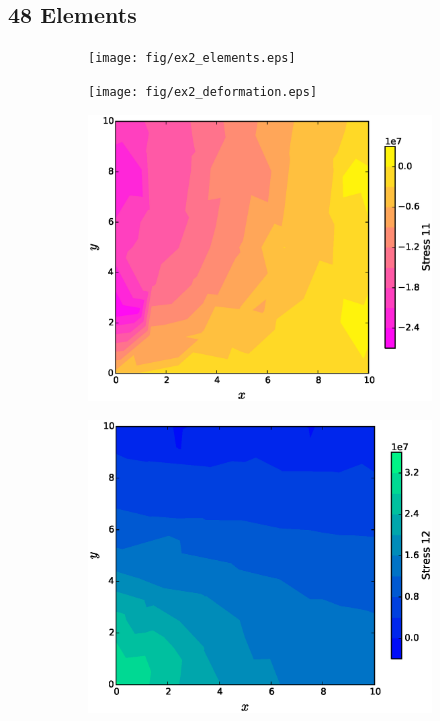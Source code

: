 \documentclass[11pt, a4paper]{article}
\numberwithin{equation}{section}
\begin{document}
\subsection{48 Elements}

\begin{figure}[H]
\centering
	\begin{subfigure}[H]{0.49\textwidth}
		\texttt{[image: fig/ex2\_elements.eps]}
		\caption{}
		\label{fig:1}
	\end{subfigure}
	\begin{subfigure}[H]{0.49\textwidth}
		\texttt{[image: fig/ex2\_deformation.eps]}
		\caption{}
		\label{fig:2}
	\end{subfigure}	
	\begin{subfigure}[H]{0.49\textwidth}
		\includegraphics[width=\textwidth]{fig/ex2_stress_11.eps}
		\caption{}
		\label{fig:1}
	\end{subfigure}
		\begin{subfigure}[H]{0.49\textwidth}
		\includegraphics[width=\textwidth]{fig/ex2_stress_12.eps}

\end{subfigure}
\end{figure}
\end{document}
